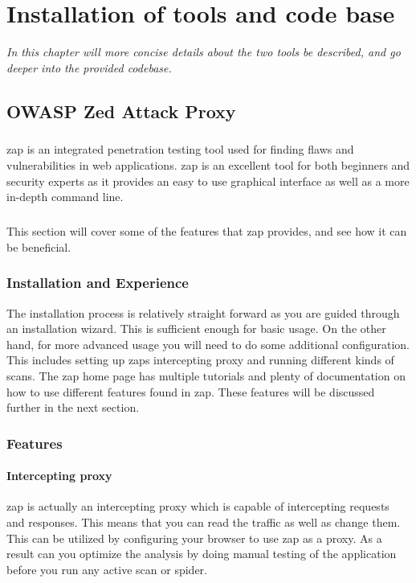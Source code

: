 \documentclass[11pt,english,a4paper]{report}
\begin{document}
\chapter{Installation of tools and code base}
\textit{In this chapter will more concise details about the two tools be described, and go deeper into the provided codebase.}

\section{OWASP Zed Attack Proxy}
\paragraph{}
\gls{zap} is an integrated penetration testing tool used for finding flaws and vulnerabilities in web applications. 
\gls{zap} is an excellent tool for both beginners and security experts as it provides an easy to use graphical interface as well as a more in-depth command line.

\paragraph{}
This section will cover some of the features that \gls{zap} provides, and see how it can be beneficial.

\subsection{Installation and Experience}
The installation process is relatively straight forward as you are guided through an installation wizard. 
This is sufficient enough for basic usage. 
On the other hand, for more advanced usage you will need to do some additional configuration. 
This includes setting up \glspl{zap} intercepting proxy and running different kinds of scans. 
The \gls{zap} home page has multiple tutorials and plenty of documentation on how to use different features found in \gls{zap}. 
These features will be discussed further in the next section.

\subsection{Features}
\subsubsection{Intercepting proxy}
\gls{zap} is actually an intercepting proxy which is capable of intercepting requests and responses.
This means that you can read the traffic as well as change them.
This can be utilized by configuring your browser to use \gls{zap} as a proxy.
As a result can you optimize the analysis by doing manual testing of the application before you run any active scan or spider.
\end{document}
